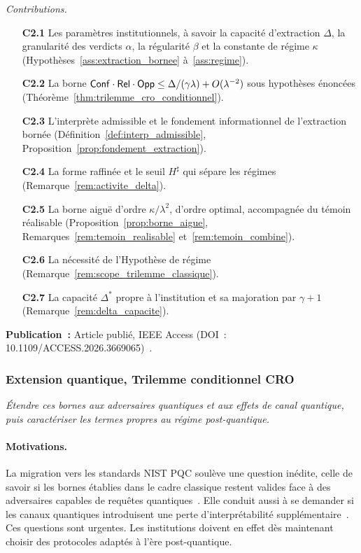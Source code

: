 \begin{sloppypar}
\noindent\textit{Contributions.}
\begin{itemize}
  \item[\textbf{C2.1}] Les param\`etres institutionnels, \`a savoir la capacit\'e d'extraction $\Delta$, la granularit\'e des verdicts $\alpha$, la r\'egularit\'e $\beta$ et la constante de r\'egime $\kappa$ (Hypoth\`eses~\ref{ass:extraction_bornee} \`a~\ref{ass:regime}).
  \item[\textbf{C2.2}] La borne $\mathsf{Conf}\cdot\mathsf{Rel}\cdot\mathsf{Opp} \leq \Delta/(\gamma\lambda) + O(\lambda^{-2})$ sous hypoth\`eses \'enonc\'ees (Th\'eor\`eme~\ref{thm:trilemme_cro_conditionnel}).
  \item[\textbf{C2.3}] L'interpr\`ete admissible et le fondement informationnel de l'extraction born\'ee (D\'efinition~\ref{def:interp_admissible}, Proposition~\ref{prop:fondement_extraction}).
  \item[\textbf{C2.4}] La forme raffin\'ee et le seuil $H^\sharp$ qui s\'epare les r\'egimes (Remarque~\ref{rem:activite_delta}).
  \item[\textbf{C2.5}] La borne aigu\"e d'ordre $\kappa/\lambda^2$, d'ordre optimal, accompagn\'ee du t\'emoin r\'ealisable (Proposition~\ref{prop:borne_aigue}, Remarques~\ref{rem:temoin_realisable} et~\ref{rem:temoin_combine}).
  \item[\textbf{C2.6}] La n\'ecessit\'e de l'Hypoth\`ese de r\'egime (Remarque~\ref{rem:scope_trilemme_classique}).
  \item[\textbf{C2.7}] La capacit\'e $\Delta^*$ propre \`a l'institution et sa majoration par $\gamma + 1$ (Remarque~\ref{rem:delta_capacite}).
\end{itemize}

\textbf{Publication~:} Article publi\'e, IEEE Access
(DOI~: 10.1109/ACCESS.2026.3669065)~\cite{MINKA2026CRO}.

\subsubsection{Extension quantique, Trilemme conditionnel CRO}
\label{subsubsec:obj3_pqcro}

\begin{objectif}\label{obj:obj3_postquantique}
\textit{\'Etendre ces bornes aux adversaires quantiques et aux effets de canal quantique, puis caract\'eriser les termes propres au r\'egime post-quantique.}
\end{objectif}

\paragraph{Motivations.}
La migration vers les standards NIST PQC soul\`eve une question in\'edite, celle de savoir si
les bornes \'etablies dans le cadre classique restent valides face \`a
des adversaires capables de requ\^etes quantiques~\cite{Kiltz2017}. Elle conduit aussi \`a se demander si les canaux quantiques
introduisent une perte d'interpr\'etabilit\'e suppl\'ementaire~\cite{Schumacher1997}. Ces
questions sont urgentes. Les institutions doivent en effet d\`es maintenant
choisir des protocoles adapt\'es \`a l'\`ere post-quantique.


\end{sloppypar}
